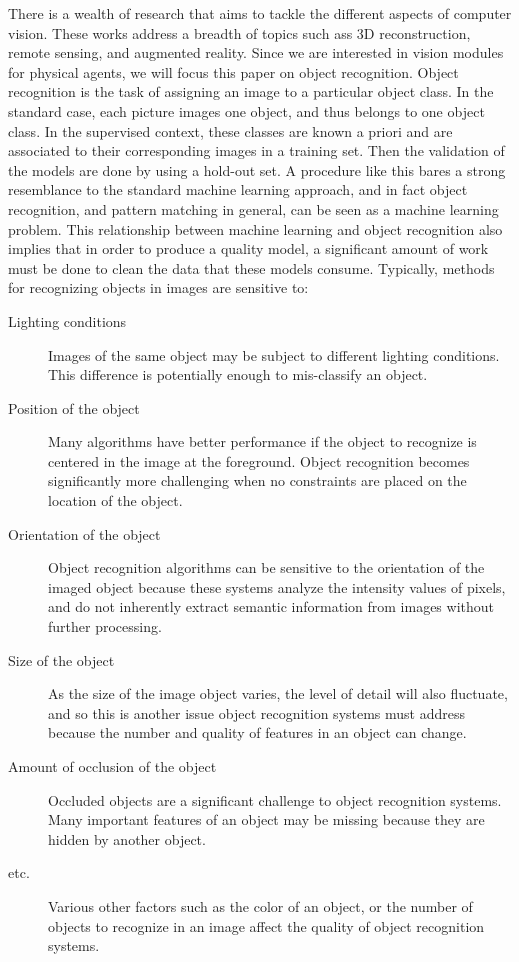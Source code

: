 \documentclass[conference]{IEEEtran}
\begin{document}
There is a wealth of research that aims to tackle the different aspects of computer vision. These works address a breadth of topics such ass 3D reconstruction, remote sensing, and augmented reality. Since we are interested in vision modules for physical agents, we will focus this paper on object recognition. Object recognition is the task of assigning an image to a particular object class. In the standard case, each picture images one object, and thus belongs to one object class. In the supervised context, these classes are known a priori and are associated to their corresponding images in a training set. Then the validation of the models are done by using a hold-out set. A procedure like this bares a strong resemblance to the standard machine learning approach, and in fact object recognition, and pattern matching in general, can be seen as a machine learning problem. This relationship between machine learning and object recognition also implies that in order to produce a quality model, a significant amount of work must be done to clean the data that these models consume. Typically, methods for recognizing objects in images are sensitive to:
\begin{description}
\item [Lighting conditions]
  Images of the same object may be subject to different lighting conditions. This difference is potentially enough to mis-classify an object.
\item [Position of the object]
  Many algorithms have better performance if the object to recognize is centered in the image at the foreground. Object recognition becomes significantly more challenging when no constraints are placed on the location of the object.
\item [Orientation of the object]
  Object recognition algorithms can be sensitive to the orientation of the imaged object because these systems analyze the intensity values of pixels, and do not inherently extract semantic information from images without further processing.
\item [Size of the object]
  As the size of the image object varies, the level of detail will also fluctuate, and so this is another issue object recognition systems must address because the number and quality of features in an object can change.
\item [Amount of occlusion of the object]
  Occluded objects are a significant challenge to object recognition systems. Many important features of an object may be missing because they are hidden by another object. 
\item [etc.]
  Various other factors such as the color of an object, or the number of objects to recognize in an image affect the quality of object recognition systems.
\end{description}
\end{document}
